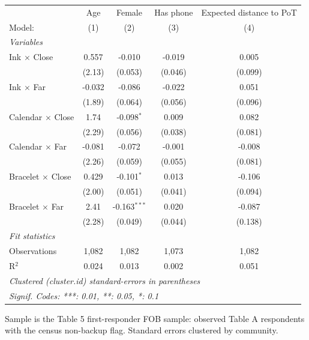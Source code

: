 
 
\caption{\label{tab:first-responder-balance-diagnostics} Covariate Balance in the First-Responder FOB Sample}
\centering
\begin{tabular}{lcccc}
   \tabularnewline \midrule \midrule
                            & Age    & Female         & Has phone & Expected distance to PoT \\   
   Model:                   & (1)    & (2)            & (3)       & (4)\\  
   \midrule
   \emph{Variables}\\
   Ink $\times$ Close       & 0.557  & -0.010         & -0.019    & 0.005\\   
                            & (2.13) & (0.053)        & (0.046)   & (0.099)\\   
   Ink $\times$ Far         & -0.032 & -0.086         & -0.022    & 0.051\\   
                            & (1.89) & (0.064)        & (0.056)   & (0.096)\\   
   Calendar $\times$ Close  & 1.74   & -0.098$^{*}$   & 0.009     & 0.082\\   
                            & (2.29) & (0.056)        & (0.038)   & (0.081)\\   
   Calendar $\times$ Far    & -0.081 & -0.072         & -0.001    & -0.008\\   
                            & (2.26) & (0.059)        & (0.055)   & (0.081)\\   
   Bracelet $\times$ Close  & 0.429  & -0.101$^{*}$   & 0.013     & -0.106\\   
                            & (2.00) & (0.051)        & (0.041)   & (0.094)\\   
   Bracelet $\times$ Far    & 2.41   & -0.163$^{***}$ & 0.020     & -0.087\\   
                            & (2.28) & (0.049)        & (0.044)   & (0.138)\\   
   \midrule
   \emph{Fit statistics}\\
   Observations             & 1,082  & 1,082          & 1,073     & 1,082\\  
   R$^2$                    & 0.024  & 0.013          & 0.002     & 0.051\\  
   \midrule \midrule
   \multicolumn{5}{l}{\emph{Clustered (cluster.id) standard-errors in parentheses}}\\
   \multicolumn{5}{l}{\emph{Signif. Codes: ***: 0.01, **: 0.05, *: 0.1}}\\
\end{tabular}
 
\par \raggedright 
Sample is the Table 5 first-responder FOB sample: observed Table A respondents with the census non-backup flag. Standard errors clustered by community.


